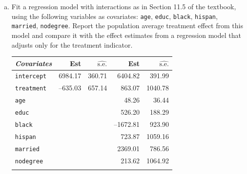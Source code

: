 \begin{enumerate}[(a)]
\begin{table}[ht!]
{    }
  \end{table}
\item 
  \begin{quoting}
    Fit a regression model with interactions as in Section 11.5 of the
    textbook, using the following variables as covariates:
    \texttt{age}, \texttt{educ}, \texttt{black}, \texttt{hispan},
    \texttt{married}, \texttt{nodegree}.  Report the population
    average treatment effect from this model and compare it with the
    effect estimates from a regression model that adjusts only for the
    treatment indicator.
  \end{quoting}
  \begin{table}[]
    \centering
    \begin{tabular}{l|rr|rr}
      \toprule
      \textit{Covariates}                                & Est    & $\widehat{\text{s.e.}}$ & Est       & $\widehat{\text{s.e.}}$ \\ \midrule
      \texttt{intercept}                     &   6984.17  & 360.71                          & 6404.82   & 391.99                  \\
      \texttt{treatment}                      &  --635.03 & 657.14                          & 863.07    & 1040.78                 \\ \midrule
      \texttt{age}                                       &        &                         & 48.26     & 36.44                   \\
      \texttt{educ}                                      &        &                         & 526.20    & 188.29                  \\
      \texttt{black}                                     &        &                         & --1672.81 & 923.90                  \\
      \texttt{hispan}                                    &        &                         & 723.87    & 1059.16                 \\
      \texttt{married}                                   &        &                         & 2369.01   & 786.56                  \\
      \texttt{nodegree}                                  &        &                         & 213.62    & 1064.92                 \\
                                                         &        &                         &           &                         \\

\end{tabular}
\end{table}
\end{enumerate}
